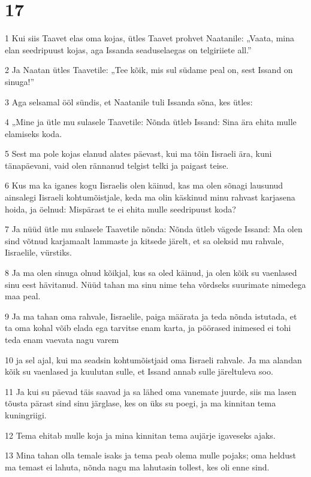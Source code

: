 \chapter{17}

\par 1 Kui siis Taavet elas oma kojas, ütles Taavet prohvet Naatanile: „Vaata, mina elan seedripuust kojas, aga Issanda seaduselaegas on telgiriiete all.”
\par 2 Ja Naatan ütles Taavetile: „Tee kõik, mis sul südame peal on, sest Issand on sinuga!”
\par 3 Aga selsamal ööl sündis, et Naatanile tuli Issanda sõna, kes ütles:
\par 4 „Mine ja ütle mu sulasele Taavetile: Nõnda ütleb Issand: Sina ära ehita mulle elamiseks koda.
\par 5 Sest ma pole kojas elanud alates päevast, kui ma tõin Iisraeli ära, kuni tänapäevani, vaid olen rännanud telgist telki ja paigast teise.
\par 6 Kus ma ka iganes kogu Iisraelis olen käinud, kas ma olen sõnagi lausunud ainsalegi Iisraeli kohtumõistjale, keda ma olin käskinud minu rahvast karjasena hoida, ja öelnud: Mispärast te ei ehita mulle seedripuust koda?
\par 7 Ja nüüd ütle mu sulasele Taavetile nõnda: Nõnda ütleb vägede Issand: Ma olen sind võtnud karjamaalt lammaste ja kitsede järelt, et sa oleksid mu rahvale, Iisraelile, vürstiks.
\par 8 Ja ma olen sinuga olnud kõikjal, kus sa oled käinud, ja olen kõik su vaenlased sinu eest hävitanud. Nüüd tahan ma sinu nime teha võrdseks suurimate nimedega maa peal.
\par 9 Ja ma tahan oma rahvale, Iisraelile, paiga määrata ja teda nõnda istutada, et ta oma kohal võib elada ega tarvitse enam karta, ja pöörased inimesed ei tohi teda enam vaevata nagu varem
\par 10 ja sel ajal, kui ma seadsin kohtumõistjaid oma Iisraeli rahvale. Ja ma alandan kõik su vaenlased ja kuulutan sulle, et Issand annab sulle järeltuleva soo.
\par 11 Ja kui su päevad täis saavad ja sa lähed oma vanemate juurde, siis ma lasen tõusta pärast sind sinu järglase, kes on üks su poegi, ja ma kinnitan tema kuningriigi.
\par 12 Tema ehitab mulle koja ja mina kinnitan tema aujärje igaveseks ajaks.
\par 13 Mina tahan olla temale isaks ja tema peab olema mulle pojaks; oma heldust ma temast ei lahuta, nõnda nagu ma lahutasin tollest, kes oli enne sind.
